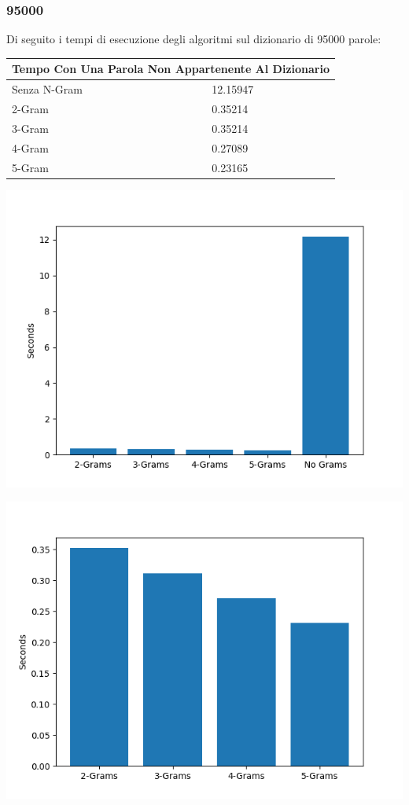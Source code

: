 \documentclass{article}
\begin{document}
\subsubsection{95000}
Di seguito i tempi di esecuzione degli algoritmi sul dizionario di 95000 parole:
\medskip

\begin{tabular}{ |p{3cm}||p{3.5cm}|  }
 \hline
 \multicolumn{2}{|c|}{Tempo Con Una Parola Non Appartenente Al Dizionario} \\
\hline
 Senza N-Gram  &   12.15947\\\hline
 2-Gram &  0.35214   \\\hline
 3-Gram & 0.35214\\\hline
 4-Gram & 0.27089\\\hline
 5-Gram & 0.23165  \\
 \hline
\end{tabular}

\includegraphics[scale=0.5]{img/ParolaNonAppartenente95000_parole.png}

\includegraphics[scale=0.5]{img/ParolaNonAppartenenteSoloGram95000_parole.png}
\end{document}

